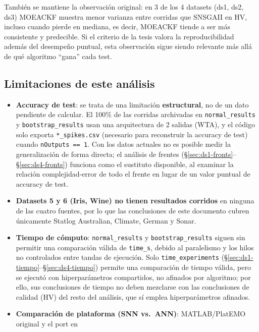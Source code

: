 También se mantiene la observación original: en 3 de los 4 datasets (ds1, ds2, ds3) MOEACKF
muestra menor varianza entre corridas que SNSGAII en HV, incluso cuando pierde en mediana, es
decir, MOEACKF tiende a ser más consistente y predecible. Si el criterio de la tesis valora la
reproducibilidad además del desempeño puntual, esta observación sigue siendo relevante más allá
de qué algoritmo ``gana'' cada test.

\subsection{Limitaciones de este análisis}
\label{sec:limitaciones}

\begin{itemize}
  \item \textbf{Accuracy de test}: se trata de una limitación \textbf{estructural}, no de un dato
        pendiente de calcular. El 100\% de las corridas archivadas en \texttt{normal\_results} y
        \texttt{bootstrap\_results} usan una arquitectura de 2 salidas (WTA), y el código solo
        exporta \texttt{*\_spikes.csv} (necesario para reconstruir la accuracy de test) cuando
        \texttt{nOutputs == 1}. Con los datos actuales no es posible medir la generalización de
        forma directa; el análisis de frentes (\S\ref{sec:ds1-fronts}--\S\ref{sec:ds4-fronts})
        funciona como el sustituto disponible, al examinar la relación complejidad-error de todo
        el frente en lugar de un valor puntual de accuracy de test.
  \item \textbf{Datasets 5 y 6 (Iris, Wine) no tienen resultados corridos} en ninguna de las
        cuatro fuentes, por lo que las conclusiones de este documento cubren únicamente Statlog
        Australian, Climate, German y Sonar.
  \item \textbf{Tiempo de cómputo}: \texttt{normal\_results} y \texttt{bootstrap\_results} siguen
        sin permitir una comparación válida de \texttt{time\_s}, debido al paralelismo y los
        hilos no controlados entre tandas de ejecución. Solo \texttt{time\_experiments}
        (\S\ref{sec:ds1-tiempo}--\S\ref{sec:ds4-tiempo}) permite una comparación de tiempo válida,
        pero se ejecutó con hiperparámetros compartidos, no afinados por algoritmo; por ello, sus
        conclusiones de tiempo no deben mezclarse con las conclusiones de calidad (HV) del resto
        del análisis, que sí emplea hiperparámetros afinados.
  \item \textbf{Comparación de plataforma (SNN vs.\ ANN)}: MATLAB/PlatEMO original y el port en

\end{itemize}

